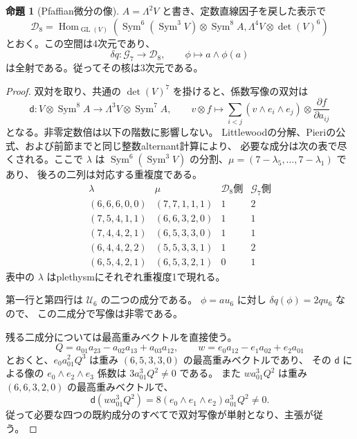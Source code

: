 \documentclass[a4paper,11pt]{ltjsarticle}
\theoremstyle{definition}
\newtheorem{proposition}[theorem]{命題}
\newcommand{\Sym}{\operatorname{Sym}}
\begin{document}
\begin{proposition}[Pfaffian微分の像]
\label{prop:degree-twelve-pfaffian-image}
$A=\Lambda^2V$ と書き、定数直線因子を戻した表示で
\[
 \mathcal D_8=\operatorname{Hom}_{\operatorname{GL}(V)}
 \left(\operatorname{Sym}^6(\operatorname{Sym}^3V)
       \otimes\operatorname{Sym}^8A,
       \Lambda^4V\otimes\det(V)^6\right)
\]
とおく。この空間は4次元であり、
\[
 \delta q\colon\mathcal G_7\longrightarrow\mathcal D_8,
 \qquad\phi\longmapsto a\wedge\phi(a)
\]
は全射である。従ってその核は3次元である。
\end{proposition}
\begin{proof}
双対を取り、共通の $\det(V)^7$ を掛けると、係数写像の双対は
\[
 \mathsf d\colon V\otimes\operatorname{Sym}^8A
       \longrightarrow\Lambda^3V\otimes\operatorname{Sym}^7A,
 \qquad
 v\otimes f\longmapsto
 \sum_{i<j}(v\wedge e_i\wedge e_j)\otimes
                \frac{\partial f}{\partial a_{ij}}
\]
となる。非零定数倍は以下の階数に影響しない。
Littlewoodの分解、Pieriの公式、および前節までと同じ整数alternant計算により、
必要な成分は次の表で尽くされる。ここで $\lambda$ は
$\Sym^6(\Sym^3V)$ の分割、$\mu=(7-\lambda_5,\ldots,7-\lambda_1)$ であり、
後ろの二列は対応する重複度である。
\[
\begin{array}{c|c|c|c}
 \lambda&\mu&\mathcal D_8\text{側}&\mathcal G_7\text{側}\\ \hline
 (6,6,6,0,0)&(7,7,1,1,1)&1&2\\
 (7,5,4,1,1)&(6,6,3,2,0)&1&1\\
 (7,4,4,2,1)&(6,5,3,3,0)&1&1\\
 (6,4,4,2,2)&(5,5,3,3,1)&1&2\\
 (6,5,4,2,1)&(6,5,3,2,1)&0&1
\end{array}
\]
表中の $\lambda$ はplethysmにそれぞれ重複度1で現れる。

第一行と第四行は $\mathcal U_6$ の二つの成分である。
$\phi=a u_6$ に対し $\delta q(\phi)=2q u_6$ なので、
この二成分で写像は非零である。

残る二成分については最高重みベクトルを直接使う。
\[
 Q=a_{01}a_{23}-a_{02}a_{13}+a_{03}a_{12},
 \qquad w=e_0a_{12}-e_1a_{02}+e_2a_{01}
\]
とおくと、$e_0a_{01}^2Q^3$ は重み $(6,5,3,3,0)$ の最高重みベクトルであり、
その $\mathsf d$ による像の $e_0\wedge e_2\wedge e_3$ 係数は
$3a_{01}^3Q^2\ne0$ である。
また $w a_{01}^3Q^2$ は重み $(6,6,3,2,0)$ の最高重みベクトルで、
\[
 \mathsf d(w a_{01}^3Q^2)
       =8(e_0\wedge e_1\wedge e_2)a_{01}^3Q^2\ne0.
\]
従って必要な四つの既約成分のすべてで双対写像が単射となり、主張が従う。
\end{proof}
\end{document}
